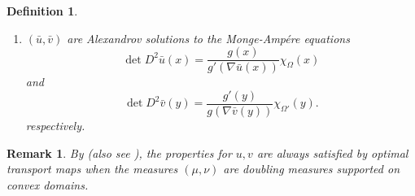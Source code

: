 \documentclass[12pt,reqno]{amsart}
\newtheorem{defn}{Definition}[section]
\newtheorem{remark}{Remark}[section]
\numberwithin{equation}{section}
\begin{document}
\begin{defn}
\begin{enumerate}
\begin{enumerate}
            \[\bar u(x) := \sup \{l(x): l \text{ is tangent to } u \text{ at some point }x_0\in \Omega\},\]
            \[\bar v(y) := \sup \{l(y): l \text{ is tangent to } v \text{ at some point }y_0\in \Omega'\}. \]
            Then $\bar u, \bar v\in C^{1, \alpha}_{loc}(\mathbb R^n)$ for some $\alpha\in (0, 1)$, and $(\bar u, \bar v) = (v^{\star}, u^{\star})$ where $(v^{\star}, u^{\star})$ are the Legendre transforms of $(v, u)$.   
            \item $(\bar u, \bar v)$ are Alexandrov solutions to the Monge-Amp\'ere equations 
            \begin{equation}
                \det D^2\bar u(x) = \frac{g(x)}{g'(\nabla \bar u(x))}\chi_{\Omega}(x)
            \end{equation}
            and
            \begin{equation}
                \det D^2\bar v(y) = \frac{g'(y)}{g(\nabla \bar v(y))}\chi_{\Omega'}(y). 
            \end{equation}
            respectively.
            \end{enumerate}
    \end{enumerate}
\end{defn}

\begin{remark}
    By \cite[Theorem 1.1]{Jhaveri-Savin} (also see \cite[Remark 2.1]{Savin-Yu}), the properties for $u, v$ are always satisfied by optimal transport maps when the measures $(\mu, \nu)$ are doubling measures supported on convex domains. 
\end{remark}
\end{document}
